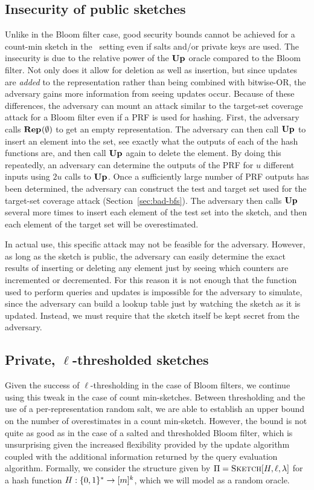 \subsection{Insecurity of public sketches}

Unlike in the Bloom filter case, good security bounds cannot be achieved for a
count-min sketch in the \errep\ setting even if salts and/or private keys are
used. The insecurity is due to the relative power of the $\textup{\textbf{Up}}\hspace{0.5pt}$ oracle compared
to the Bloom filter. Not only does it allow for deletion as well as
insertion, but since updates are \emph{added} to the representation rather than
being combined with bitwise-OR, the adversary gains more information from
seeing updates occur. Because of these differences, the adversary can mount
an attack similar to the target-set coverage attack for a Bloom filter even if a
PRF is used for
hashing. First, the adversary calls $\textup{\textbf{Rep}}\hspace{0.5pt}(\emptyset)$ to get an empty
representation. The adversary can then call $\textup{\textbf{Up}}\hspace{0.5pt}$ to insert an element into the
set, see exactly what the outputs of each of the hash functions are, and then
call $\textup{\textbf{Up}}\hspace{0.5pt}$ again to delete the element. By doing this repeatedly, an adversary
can determine the outputs of the PRF for $u$ different inputs using $2u$ calls
to $\textup{\textbf{Up}}\hspace{0.5pt}$. Once a sufficiently large number of PRF outputs has been determined,
the adversary can construct the test and target set used for the target-set
coverage attack (Section~\ref{sec:bad-bfs}). The adversary then calls $\textup{\textbf{Up}}\hspace{0.5pt}$ several more times to insert
each element of the test set into the sketch, and then
each element of the target set will be overestimated.

In actual use, this specific attack may not be feasible for the adversary.
However, as long as the sketch is public, the adversary can easily determine the
exact results of inserting or deleting any element just by seeing which counters
are incremented or decremented. For this reason it is not enough that the
function used to perform queries and updates is impossible for the adversary to
simulate, since the adversary can build a lookup table just by watching the
sketch as it is updated. Instead, we must require that the sketch itself be kept
secret from the adversary.

\subsection{Private, $\ell$-thresholded sketches}

Given the success of $\ell$-thresholding in the case of Bloom filters, we
continue using this tweak in the case of count min-sketches. Between
thresholding and the use of a per-representation random salt, we are able to
establish an upper bound on the number of overestimates in a count min-sketch.
However, the bound is not quite as good as in the case of a salted and
thresholded Bloom filter, which is unsurprising given the increased flexibility
provided by the update algorithm coupled with the additional
information returned by the query evaluation algorithm.
%
Formally, we consider the structure given by $\Pi = \textnormal{\textsc{Sketch}}[H,\ell,\lambda]$ for
a hash function $H: \{0,1\}^* \to [m]^k$, which we will model as a random oracle.


